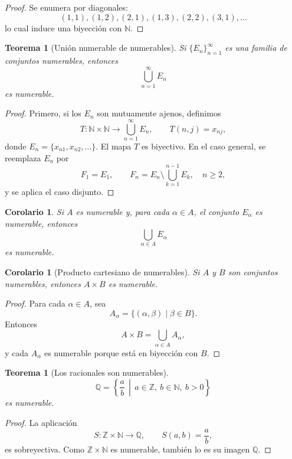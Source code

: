 \documentclass[12pt]{article}
\theoremstyle{definition}
\theoremstyle{plain}
\newtheorem{theorem}[definition]{Teorema}
\newtheorem{corollary}[definition]{Corolario}
\theoremstyle{remark}
\begin{document}
\begin{proof}
Se enumera por diagonales:
\[
(1,1),(1,2),(2,1),(1,3),(2,2),(3,1),\dots
\]
lo cual induce una biyección con $\mathbb N$.
\end{proof}

\begin{theorem}[Unión numerable de numerables]
Si $\{E_n\}_{n=1}^\infty$ es una familia de conjuntos numerables, entonces
\[
\bigcup_{n=1}^\infty E_n
\]
es numerable.
\end{theorem}

\begin{proof}
Primero, si los $E_n$ son mutuamente ajenos, definimos
\[
T\colon\mathbb N\times\mathbb N\to \bigcup_{n=1}^\infty E_n,
\qquad T(n,j)=x_{nj},
\]
donde $E_n=\{x_{n1},x_{n2},\dots\}$.
El mapa $T$ es biyectivo.
En el caso general, se reemplaza $E_n$ por
\[
F_1=E_1,\qquad F_n=E_n\setminus\bigcup_{k=1}^{n-1}E_k,\quad n\ge2,
\]
y se aplica el caso disjunto.
\end{proof}

\begin{corollary}
Si $A$ es numerable y, para cada $\alpha\in A$, el conjunto $E_\alpha$ es numerable, entonces
\[
\bigcup_{\alpha\in A}E_\alpha
\]
es numerable.
\end{corollary}

\begin{corollary}[Producto cartesiano de numerables]
Si $A$ y $B$ son conjuntos numerables, entonces $A\times B$ es numerable.
\end{corollary}

\begin{proof}
Para cada $\alpha\in A$, sea
\[
A_\alpha=\{(\alpha,\beta)\mid \beta\in B\}.
\]
Entonces
\[
A\times B=\bigcup_{\alpha\in A}A_\alpha,
\]
y cada $A_\alpha$ es numerable porque está en biyección con $B$.
\end{proof}

\begin{theorem}[Los racionales son numerables]
\[
\mathbb Q=\left\{\frac{a}{b}\,\middle|\, a\in\mathbb Z,\ b\in\mathbb N,\ b>0\right\}
\]
es numerable.
\end{theorem}

\begin{proof}
La aplicación
\[
S\colon\mathbb Z\times\mathbb N\to\mathbb Q,\qquad S(a,b)=\frac ab,
\]
es sobreyectiva.
Como $\mathbb Z\times\mathbb N$ es numerable, también lo es su imagen $\mathbb Q$.
\end{proof}
\end{document}
